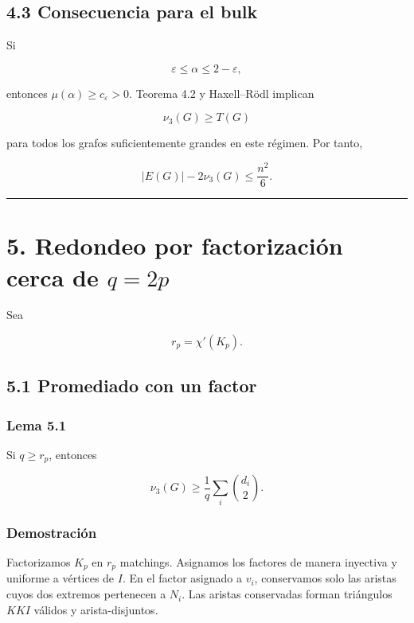 \documentclass[spanish,11pt,a4paper]{article}
\begin{document}
\subsection{4.3 Consecuencia para el
bulk}\label{consecuencia-para-el-bulk}

Si

\[
\varepsilon\le\alpha\le2-\varepsilon,
\]

entonces \(\mu(\alpha)\ge c_\varepsilon>0\). Teorema 4.2 y Haxell--Rödl
implican

\[
\nu_3(G)\ge T(G)
\]

para todos los grafos suficientemente grandes en este régimen. Por
tanto,

\[
|E(G)|-2\nu_3(G)
\le
\frac{n^2}{6}.
\tag{4.6}
\]

\begin{center}\rule{0.5\linewidth}{0.5pt}\end{center}

\section{\texorpdfstring{5. Redondeo por factorización cerca de
\(q=2p\)}{5. Redondeo por factorización cerca de q=2p}}\label{redondeo-por-factorizaciuxf3n-cerca-de-q2p}

Sea

\[
r_p=\chi'(K_p).
\]

\subsection{5.1 Promediado con un
factor}\label{promediado-con-un-factor}

\subsubsection{Lema 5.1}\label{lema-5.1}

Si \(q\ge r_p\), entonces

\[
\boxed{
\nu_3(G)
\ge
\frac1q\sum_i\binom{d_i}{2}
}.
\tag{5.1}
\]

\subsubsection{Demostración}\label{demostraciuxf3n-3}

Factorizamos \(K_p\) en \(r_p\) matchings. Asignamos los factores de
manera inyectiva y uniforme a vértices de \(I\). En el factor asignado a
\(v_i\), conservamos solo las aristas cuyos dos extremos pertenecen a
\(N_i\). Las aristas conservadas forman triángulos \(KKI\) válidos y
arista-disjuntos.
\end{document}
